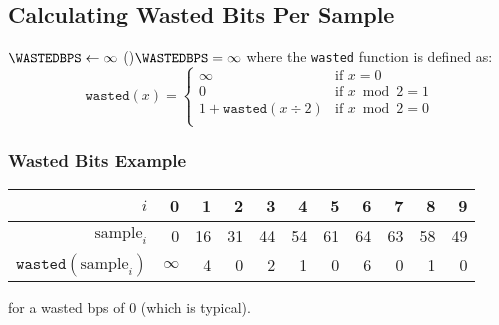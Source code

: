 {\subsection{Calculating Wasted Bits Per Sample}
\label{wavpack:wasted_bps}
{
$\text{\WASTEDBPS} \leftarrow \infty$
\eIf(){$\WASTEDBPS = \infty$}{
  \;
}{
  \Return \WASTEDBPS\;
}
\EALGORITHM
where the \texttt{wasted} function is defined as:
\begin{equation*}
\texttt{wasted}(x) =
\begin{cases}
\infty & \text{if } x = 0 \\
0 & \text{if } x \bmod 2 = 1 \\
1 + \texttt{wasted}(x \div 2) & \text{if } x \bmod 2 = 0 \\
\end{cases}
\end{equation*}
}
\subsubsection{Wasted Bits Example}
\begin{table}[h]
{
\begin{tabular}{r|rrrrrrrrrr}
$i$ & 0 & 1 & 2 & 3 & 4 & 5 & 6 & 7 & 8 & 9 \\
\hline
$\text{sample}_i$ & 0 & 16 & 31 & 44 & 54 & 61 & 64 & 63 & 58 & 49 \\
$\texttt{wasted}(\text{sample}_i)$ & $\infty$ & 4 & 0 & 2 & 1 & 0 & 6 & 0 & 1 & 0 \\
\end{tabular}
}
\end{table}
\par
\noindent
for a wasted bps of 0 (which is typical).

\begin{landscape}


\end{landscape}}
